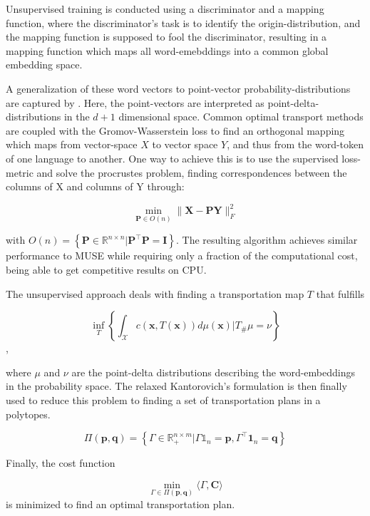 \documentclass[a4paper,12pt,twoside,openright]{report}
\begin{document}
Unsupervised training is conducted using a discriminator and a mapping function, where the discriminator's task is to identify the origin-distribution, and the mapping function is supposed to fool the discriminator, resulting in a mapping function which maps all word-emebddings into a common global embedding space.

A generalization of these word vectors to point-vector probability-distributions are captured by \cite{alvarez18}.
Here, the point-vectors are interpreted as point-delta-distributions in the $d+1$ dimensional space.
Common optimal transport methods are coupled with the Gromov-Wasserstein loss to find an orthogonal mapping which maps from vector-space $X$ to vector space $Y$, and thus from the word-token of one language to another.
One way to achieve this is to use the supervised loss-metric and solve the procrustes problem, finding correspondences between the columns of X and columns of Y through:

\begin{equation}
\min _{\mathbf{P} \in O(n)}\|\mathbf{X}-\mathbf{P} \mathbf{Y}\|_{F}^{2}
\end{equation}

with $O(n)=\left\{\mathbf{P} \in \mathbb{R}^{n \times n} | \mathbf{P}^{\top} \mathbf{P}=\mathbf{I}\right\}$.
The resulting algorithm achieves similar performance to MUSE while requiring only a fraction of the computational cost, being able to get competitive results on CPU.

The unsupervised approach deals with finding a transportation map $T$ that fulfills

\begin{equation}
\inf _{T}\left\{\int_{\mathcal{X}} c(\mathbf{x}, T(\mathbf{x})) d \mu(\mathbf{x}) | T_{\#} \mu=\nu\right\}
\end{equation},

where $\mu$ and $\nu$ are the point-delta distributions describing the word-embeddings in the probability space.
The relaxed Kantorovich's formulation is then finally used to reduce this problem to finding a set of transportation plans in a polytopes.

$$
\Pi(\mathbf{p}, \mathbf{q})=\left\{\Gamma \in \mathbb{R}_{+}^{n \times m} | \Gamma \mathbb{1}_{n}=\mathbf{p}, \Gamma^{\top} \mathbf{1}_{n}=\mathbf{q}\right\}
$$

Finally, the cost function

$$
\min _{\Gamma \in \Pi(\mathbf{p}, \mathbf{q})}\langle\Gamma, \mathbf{C}\rangle
$$
is minimized to find an optimal transportation plan.
\end{document}

